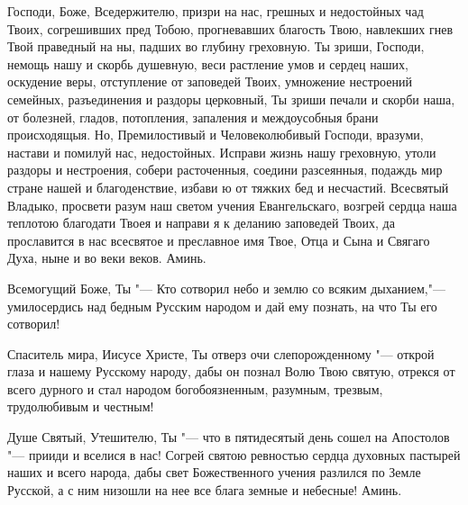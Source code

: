 \begin{mymulticols}

Господи, Боже, Вседержителю, призри на нас, грешных и недостойных чад Твоих, согрешивших пред Тобою, прогневавших благость Твою, навлекших гнев Твой праведный на ны, падших во глубину греховную. Ты зриши, Господи, немощь нашу и скорбь душевную, веси растление умов и сердец наших, оскудение веры, отступление от заповедей Твоих, умножение нестроений семейных, разъединения и раздоры церковный, Ты зриши печали и скорби наша, от болезней, гладов, потопления, запаления и междоусобныя брани происходящыя. Но, Премилостивый и Человеколюбивый Господи, вразуми, настави и помилуй нас, недостойных. Исправи жизнь нашу греховную, утоли раздоры и нестроения, собери расточенныя, соедини разсеянныя, подаждь мир стране нашей и благоденствие, избави ю от тяжких бед и несчастий. Всесвятый Владыко, просвети разум наш светом учения Евангельскаго, возгрей сердца наша теплотою благодати Твоея и направи я к деланию заповедей Твоих, да прославится в нас всесвятое и преславное имя Твое, Отца и Сына и Свягаго Духа, ныне и во веки веков. Аминь.

\end{mymulticols}

\mychapterending


\begin{mymulticols}

Всемогущий Боже, Ты "--- Кто сотворил небо и землю со всяким дыханием,"--- умилосердись над бедным Русским народом и дай ему познать, на что Ты его сотворил!

Спаситель мира, Иисусе Христе, Ты отверз очи слепорожденному "--- открой глаза и нашему Русскому народу, дабы он познал Волю Твою святую, отрекся от всего дурного и стал народом богобоязненным, разумным, трезвым, трудолюбивым и честным!

Душе Святый, Утешителю, Ты "--- что в пятидесятый день сошел на Апостолов "--- прииди и вселися в нас! Согрей святою ревностью сердца духовных пастырей наших и всего народа, дабы свет Божественного учения разлился по Земле Русской, а с ним низошли на нее все блага земные и небесные! Аминь.

\end{mymulticols}

\mychapterending


